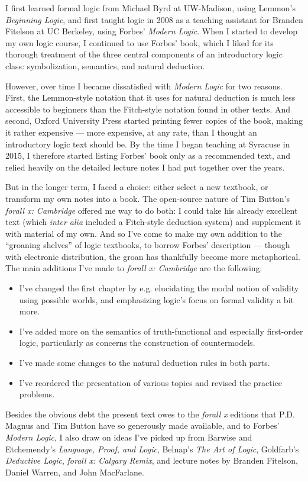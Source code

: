 I first learned formal logic from Michael Byrd at UW-Madison, using Lemmon's  \emph{Beginning Logic}, and first taught logic in 2008 as a teaching assistant for Branden Fitelson at UC Berkeley, using Forbes' \emph{Modern Logic}.  When I started to develop my own logic course, I continued to use Forbes' book, which I liked for its thorough treatment of the three central components of an introductory logic class: symbolization, semantics, and natural deduction.  

However, over time I became dissatisfied with \emph{Modern Logic} for two reasons.  First, the Lemmon-style notation that it uses for natural deduction is much less accessible to beginners than the Fitch-style notation found in other texts.  And second, Oxford University Press started printing fewer copies of the book, making it rather expensive --- more expensive, at any rate, than I thought an introductory logic text should be.  By the time I began teaching at Syracuse in 2015, I therefore started listing Forbes' book only as a recommended text, and relied heavily on the detailed lecture notes I had put together over the years.

But in the longer term, I faced a choice: either select a new textbook, or transform my own notes into a book.  The open-source nature of Tim Button's \emph{forall x: Cambridge} offered me way to do both: I could take his already excellent text (which \emph{inter alia} included a Fitch-style deduction system) and supplement it with material of my own.  And so I've come to make my own addition to the ``groaning shelves'' of logic textbooks, to borrow Forbes' description --- though with electronic distribution, the groan has thankfully become more metaphorical. The main additions I've made to \emph{forall x: Cambridge} are the following:
\begin{itemize}
\item I've changed the first chapter by e.g. elucidating the modal notion of validity using possible worlds, and emphasizing logic's focus on formal validity a bit more.
\item I've added more on the semantics of truth-functional and especially first-order logic, particularly as concerns the construction of countermodels.  
\item I've made some changes to the natural deduction rules in both parts.
\item I've reordered the presentation of various topics and revised the practice problems.
\end{itemize}
Besides the obvious debt the present text owes to the \emph{forall x} editions that P.D. Magnus and Tim Button have so generously made available,  and to Forbes' \emph{Modern Logic}, I also draw on ideas I've picked up from Barwise and Etchemendy's \emph{Language, Proof, and Logic}, Belnap's \emph{The Art of Logic}, Goldfarb's \emph{Deductive Logic}, \emph{forall x: Calgary Remix}, and lecture notes by Branden Fitelson,  Daniel Warren, and John MacFarlane.


